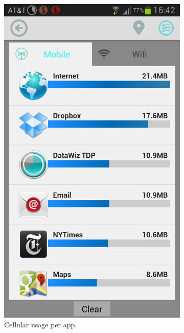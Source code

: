 \begin{figure}
\begin{subfigure}[b]{0.23\textwidth}
	\includegraphics[width = \textwidth]{Figures/Apps_Mobile.png}
	\caption{Cellular usage per app.}
	\label{fig:datawiz_main_graph}
	\end{subfigure}
	\begin{subfigure}[b]{0.23\textwidth}

\end{subfigure}
\end{figure}
